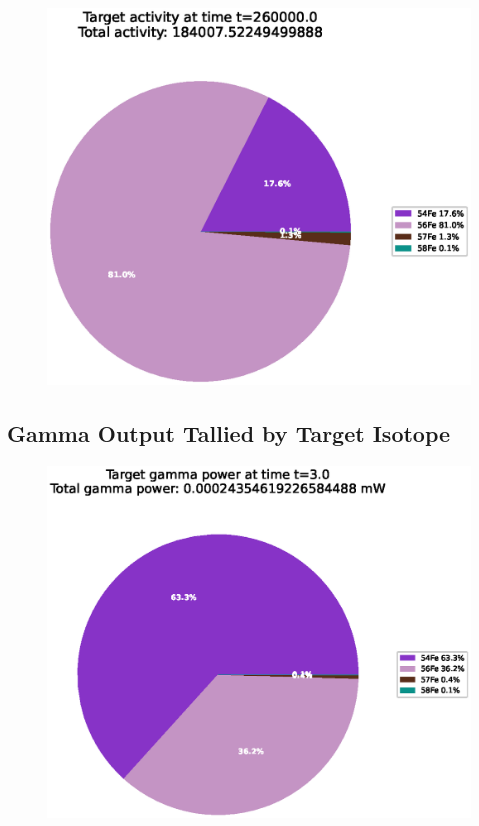 \begin{figure}[!htb]
\centering
\includegraphics[width=0.8\linewidth]{chapters/activity_code/fe-activity-v2/target-activity/0300_260000.eps}
\caption{}
\label{fig:activity-v2-target-activity-260000s}
\end{figure}




\clearpage

\subsection{Gamma Output Tallied by Target Isotope}

\FloatBarrier


\begin{figure}[!htb]
\centering
\includegraphics[width=0.8\linewidth]{chapters/activity_code/fe-activity-v2/target-energy/0001_3.eps}
\caption{}
\label{fig:activity-v2-target-power-3s}
\end{figure}

